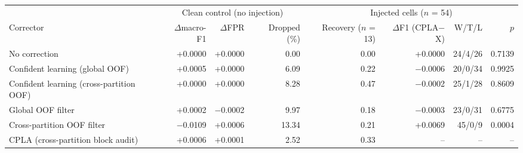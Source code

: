 \begin{tabular}{l rrr r rrr}
\toprule
& \multicolumn{3}{c}{Clean control (no injection)} & \multicolumn{4}{c}{Injected cells ($n$ = 54)}\\
\cmidrule(lr){2-4}\cmidrule(lr){5-8}
Corrector & $\Delta$macro-F1 & $\Delta$FPR & Dropped (\%) & Recovery ($n$ = 13) & $\Delta$F1 (CPLA$-$X) & W/T/L & $p$\\
\midrule
No correction & +0.0000 & +0.0000 & 0.00 & 0.00 & +0.0000 & 24/4/26 & 0.7139\\
Confident learning (global OOF) & +0.0005 & +0.0000 & 6.09 & 0.22 & $-$0.0006 & 20/0/34 & 0.9925\\
Confident learning (cross-partition OOF) & +0.0000 & +0.0000 & 8.28 & 0.47 & $-$0.0002 & 25/1/28 & 0.8609\\
Global OOF filter & +0.0002 & $-$0.0002 & 9.97 & 0.18 & $-$0.0003 & 23/0/31 & 0.6775\\
Cross-partition OOF filter & $-$0.0109 & +0.0006 & 13.34 & 0.21 & +0.0069 & 45/0/9 & 0.0004\\
\midrule
CPLA (cross-partition block audit) & +0.0006 & +0.0001 & 2.52 & 0.33 & -- & -- & --\\
\bottomrule
\end{tabular}
